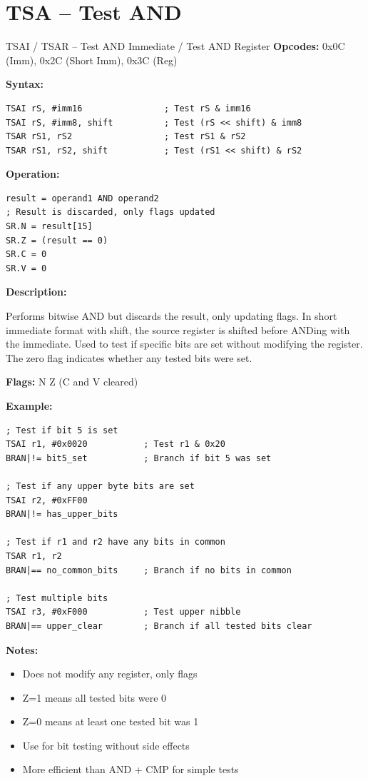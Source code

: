 \section{TSA -- Test AND}

\begin{instructionbox}{TSAI / TSAR -- Test AND Immediate / Test AND Register}
	\textbf{Opcodes:} 0x0C (Imm), 0x2C (Short Imm), 0x3C (Reg)

	\textbf{Syntax:}
	\begin{lstlisting}
TSAI rS, #imm16                ; Test rS & imm16
TSAI rS, #imm8, shift          ; Test (rS << shift) & imm8
TSAR rS1, rS2                  ; Test rS1 & rS2
TSAR rS1, rS2, shift           ; Test (rS1 << shift) & rS2
\end{lstlisting}

	\textbf{Operation:}
	\begin{verbatim}
result = operand1 AND operand2
; Result is discarded, only flags updated
SR.N = result[15]
SR.Z = (result == 0)
SR.C = 0
SR.V = 0
\end{verbatim}

	\textbf{Description:}

	Performs bitwise AND but discards the result, only updating flags. In short immediate format with shift, the source
	register is shifted before ANDing with the immediate. Used to test if specific bits are set without modifying the
	register. The zero flag indicates whether any tested bits were set.

	\textbf{Flags:} N Z (C and V cleared)

	\textbf{Example:}
	\begin{lstlisting}
; Test if bit 5 is set
TSAI r1, #0x0020           ; Test r1 & 0x20
BRAN|!= bit5_set           ; Branch if bit 5 was set

; Test if any upper byte bits are set
TSAI r2, #0xFF00
BRAN|!= has_upper_bits

; Test if r1 and r2 have any bits in common
TSAR r1, r2
BRAN|== no_common_bits     ; Branch if no bits in common

; Test multiple bits
TSAI r3, #0xF000           ; Test upper nibble
BRAN|== upper_clear        ; Branch if all tested bits clear
\end{lstlisting}

	\textbf{Notes:}
	\begin{itemize}
		\item Does not modify any register, only flags
		\item Z=1 means all tested bits were 0
		\item Z=0 means at least one tested bit was 1
		\item Use for bit testing without side effects
		\item More efficient than AND + CMP for simple tests
	\end{itemize}
\end{instructionbox}

